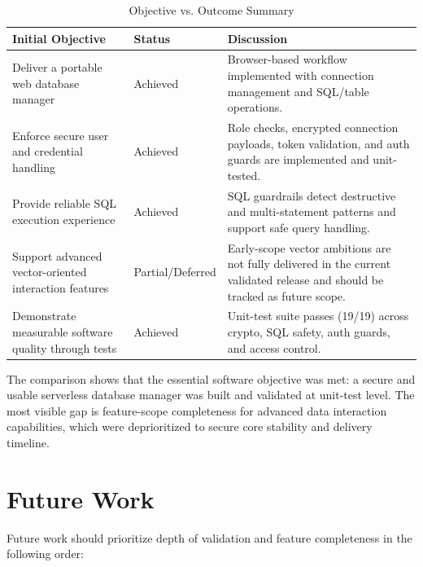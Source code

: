 \begin{table}[H]
    \centering
    \caption{Objective vs. Outcome Summary}
    \label{tab:objective-outcome}
    \begin{tabular}{|p{}|p{}|p{}|}
        \hline
        \textbf{Initial Objective} & \textbf{Status} & \textbf{Discussion} \\
        \hline
        Deliver a portable web database manager & Achieved & Browser-based workflow implemented with connection management and SQL/table operations. \\
        \hline
        Enforce secure user and credential handling & Achieved & Role checks, encrypted connection payloads, token validation, and auth guards are implemented and unit-tested. \\
        \hline
        Provide reliable SQL execution experience & Achieved & SQL guardrails detect destructive and multi-statement patterns and support safe query handling. \\
        \hline
        Support advanced vector-oriented interaction features & Partial/Deferred & Early-scope vector ambitions are not fully delivered in the current validated release and should be tracked as future scope. \\
        \hline
        Demonstrate measurable software quality through tests & Achieved & Unit-test suite passes (19/19) across crypto, SQL safety, auth guards, and access control. \\
        \hline
    \end{tabular}
\end{table}

The comparison shows that the essential software objective was met: a secure and usable serverless database manager was built and validated at unit-test level. The most visible gap is feature-scope completeness for advanced data interaction capabilities, which were deprioritized to secure core stability and delivery timeline.


\section{Future Work}

Future work should prioritize depth of validation and feature completeness in the following order:

